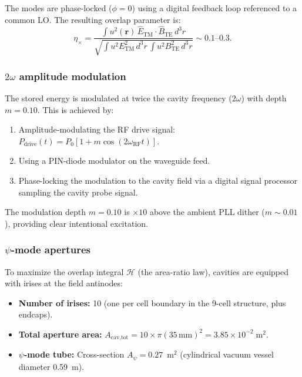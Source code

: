 \documentclass[11pt,letterpaper]{article}
\newcommand{\ee}[1]{\times 10^{#1}}
\newcommand{\psifield}{\psi}
\begin{document}
The modes are phase-locked ($\phi = 0$) using a digital feedback
loop referenced to a common LO. The resulting overlap parameter is:
\begin{equation}
\eta_\times = \frac{\int u^2(\mathbf{r})\,
\hat{E}_\text{TM}\cdot\hat{B}_\text{TE}\,d^3r}
{\sqrt{\int u^2 E_\text{TM}^2\,d^3r\,
\int u^2 B_\text{TE}^2\,d^3r}}
\sim 0.1\text{--}0.3.
\label{eq:eta_cross}
\end{equation}

\subsubsection{$2\omega$ amplitude modulation}

The stored energy is modulated at twice the cavity frequency
($2\omega$) with depth $m = 0.10$. This is achieved by:

\begin{enumerate}
\item Amplitude-modulating the RF drive signal:
$P_\text{drive}(t) = P_0[1 + m\cos(2\omega_\text{RF}t)]$.
\item Using a PIN-diode modulator on the waveguide feed.
\item Phase-locking the modulation to the cavity field via a
digital signal processor sampling the cavity probe signal.
\end{enumerate}

The modulation depth $m = 0.10$ is $\times 10$ above the ambient
PLL dither ($m \sim 0.01$), providing clear intentional excitation.

\subsubsection{$\psifield$-mode apertures}

To maximize the overlap integral $\mathcal{H}$ (the area-ratio
law), cavities are equipped with irises at the field antinodes:

\begin{itemize}
\item \textbf{Number of irises:} 10 (one per cell boundary in
the 9-cell structure, plus endcaps).
\item \textbf{Total aperture area:} $A_\text{cav,tot} = 10 \times
\pi(35\,\text{mm})^2 = 3.85\ee{-2}\;\text{m}^2$.
\item \textbf{$\psifield$-mode tube:} Cross-section $A_\psi = 0.27$~m$^2$
(cylindrical vacuum vessel diameter 0.59~m).
\end{itemize}
\end{document}
